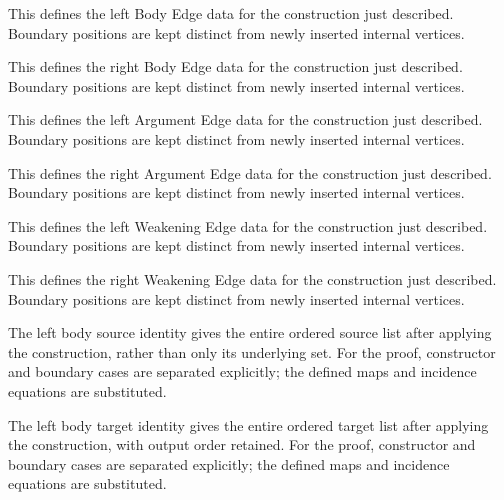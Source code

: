 This defines the left Body Edge data for the construction just described. Boundary positions are kept distinct from newly inserted internal vertices.
\par{}

This defines the right Body Edge data for the construction just described. Boundary positions are kept distinct from newly inserted internal vertices.
\par{}

This defines the left Argument Edge data for the construction just described. Boundary positions are kept distinct from newly inserted internal vertices.
\par{}

This defines the right Argument Edge data for the construction just described. Boundary positions are kept distinct from newly inserted internal vertices.
\par{}

This defines the left Weakening Edge data for the construction just described. Boundary positions are kept distinct from newly inserted internal vertices.
\par{}

This defines the right Weakening Edge data for the construction just described. Boundary positions are kept distinct from newly inserted internal vertices.
\par{}

The left body source identity gives the entire ordered source list after applying the construction, rather than only its underlying set.
For the proof, constructor and boundary cases are separated explicitly; the defined maps and incidence equations are substituted.
\par{}

The left body target identity gives the entire ordered target list after applying the construction, with output order retained.
For the proof, constructor and boundary cases are separated explicitly; the defined maps and incidence equations are substituted.
\par{}

